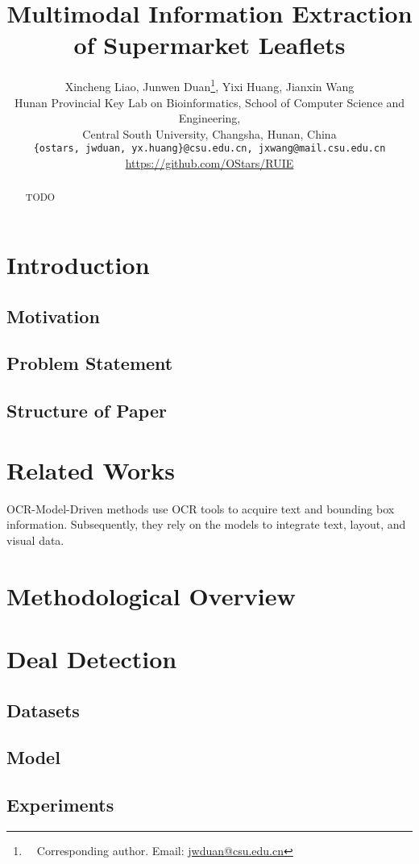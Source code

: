 \documentclass[11pt]{article}
\title{Multimodal Information Extraction of Supermarket Leaflets}
\author{Xincheng Liao\textsuperscript{}, Junwen Duan\textsuperscript{}\thanks{\ \ Corresponding author. Email: \href{mailto:jwduan@csu.edu.cn}{jwduan@csu.edu.cn}}, Yixi Huang\textsuperscript{}, Jianxin Wang\textsuperscript{} \\
Hunan Provincial Key Lab on Bioinformatics, School of Computer Science and Engineering, \\
Central South University, Changsha, Hunan, China \\
\texttt{\{ostars, jwduan, yx.huang\}@csu.edu.cn, jxwang@mail.csu.edu.cn} \\
\href{https://github.com/OStars/RUIE}{https://github.com/OStars/RUIE}
}
\begin{document}
\maketitle
\begin{abstract}
TODO
\end{abstract}

\section{Introduction}
\subsection{Motivation}
\subsection{Problem Statement}
\subsection{Structure of Paper}

\section{Related Works}
OCR-Model-Driven methods use OCR tools to acquire text
and bounding box information. Subsequently, they rely
on the models to integrate text, layout, and visual data.


\section{Methodological Overview}

\section{Deal Detection}
    \subsection{Datasets}
    \subsection{Model}
    \subsection{Experiments}
\end{document}
